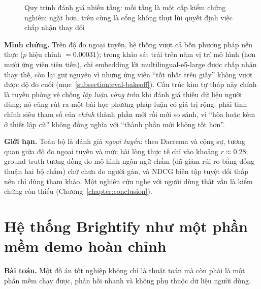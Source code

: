 \documentclass[../DoAn.tex]{subfiles}
\begin{document}
\begin{figure}[tbp]
\centering
{}
\caption{Quy trình đánh giá nhiều tầng: mỗi tầng là một cấp kiểm chứng nghiêm ngặt hơn, trên cùng là cổng không thụt lùi quyết định việc chấp nhận thay đổi}
\label{fig:eval-pyramid}
\end{figure}

\textbf{Minh chứng.} Trên độ đo ngoại tuyến, hệ thống vượt cả bốn phương pháp nền thực ($p$ hiệu chỉnh $= 0.00031$); trong khảo sát trải trên năm vị trí mô hình (hơn mười ứng viên tiên tiến), chỉ embedding lời multilingual-e5-large được chấp nhận thay thế, còn lại giữ nguyên vì những ứng viên ``tốt nhất trên giấy'' không vượt được độ đo cuối (mục~\ref{subsection:eval-bakeoff}). Cấu trúc kim tự tháp này chính là tuyến phòng vệ chống \textit{lập luận vòng tròn} khi đánh giá thiếu dữ liệu người dùng; nó cũng rút ra một bài học phương pháp luận có giá trị rộng: phải tinh chỉnh siêu tham số của \textit{chính} thành phần mới rồi mới so sánh, vì ``hòa hoặc kém ở thiết lập cũ'' không đồng nghĩa với ``thành phần mới không tốt hơn''.

\textbf{Giới hạn.} Toàn bộ là đánh giá \textit{ngoại tuyến}: theo Dacrema và cộng sự, tương quan giữa độ đo ngoại tuyến và mức hài lòng thực tế chỉ vào khoảng $r \approx 0.28$; ground truth tương đồng do mô hình ngôn ngữ chấm (đã giảm rủi ro bằng đồng thuận hai bộ chấm) chứ chưa do người gán, và NDCG biên tập tuyệt đối thấp nên chỉ dùng tham khảo. Một nghiên cứu nghe với người dùng thật vẫn là kiểm chứng còn thiếu (Chương~\ref{chapter:conclusion}).

\section{Hệ thống Brightify như một phần mềm demo hoàn chỉnh}
\label{section:5.5}
\textbf{Bài toán.} Một đồ án tốt nghiệp không chỉ là thuật toán mà còn phải là một phần mềm chạy được, phản hồi nhanh và không phụ thuộc dữ liệu người dùng.
\end{document}
